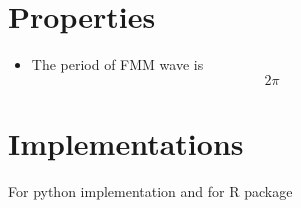 \documentclass[a4paper]{article}
\begin{document}
    
    \section{Properties}
        \begin{itemize}
            \item The period of FMM wave is $$2\pi$$
        \end{itemize}
    
    
    \section{Implementations}
        For python implementation  and for R package 
        
        
        
        
\end{document}
